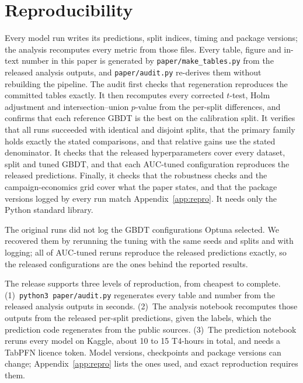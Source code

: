 \documentclass[11pt]{article}
\begin{document}
\section*{Reproducibility}
Every model run writes its predictions, split indices, timing and package versions; the analysis recomputes every
metric from those files. Every table, figure and in-text number in this paper is generated by
\texttt{paper/make\_tables.py} from the released analysis outputs, and \texttt{paper/audit.py} re-derives them
without rebuilding the pipeline. The audit first checks that regeneration reproduces the committed tables exactly. It then recomputes every corrected
$t$-test, Holm adjustment and intersection--union $p$-value from the per-split differences, and confirms that each
reference GBDT is the best on the calibration split. It verifies that all runs succeeded with identical and disjoint
splits, that the primary family holds exactly the \nPrimary{} stated comparisons, and that relative gains use the stated
denominator. It checks that the released hyperparameters cover every dataset, split and tuned GBDT, and that each AUC-tuned
configuration reproduces the released predictions. Finally, it checks that the robustness checks and the
campaign-economics grid cover what the paper states,
and that the package versions logged by every run match Appendix~\ref{app:repro}. It needs only the Python standard library.

The original runs did not log the GBDT configurations Optuna selected. We recovered them by rerunning the tuning with
the same seeds and splits and with logging; all \nHyperReproduce{} of \nHyperAUC{} AUC-tuned reruns reproduce the released
predictions exactly, so the released configurations are the ones behind the reported results.

The release supports three levels of reproduction, from cheapest to complete. (1)~\texttt{python3 paper/audit.py}
regenerates every table and number from the released analysis outputs in seconds. (2)~The analysis notebook recomputes
those outputs from the released per-split predictions, given the labels, which the prediction code regenerates from the
public sources. (3)~The prediction notebook reruns every model on Kaggle, about 10 to 15 T4-hours in total, and needs a
TabPFN licence token. Model versions, checkpoints and package versions can change; Appendix~\ref{app:repro} lists the
ones used, and exact reproduction requires them.
\end{document}
